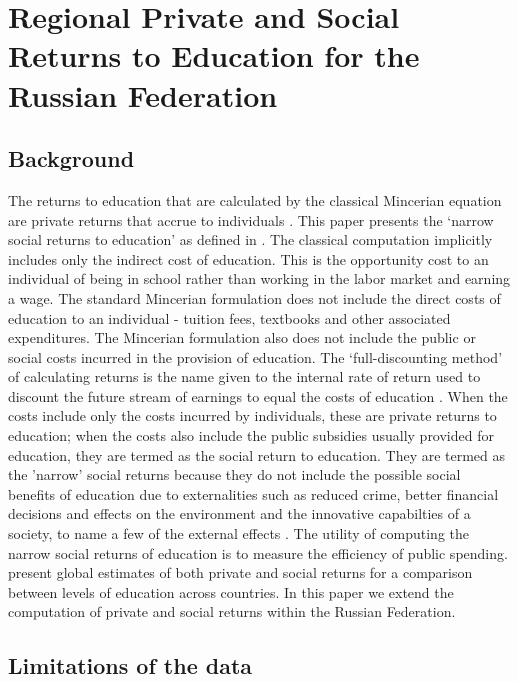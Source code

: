 \documentclass[alpha-refs]{wiley-article-05g}
\begin{document}
\vspace{-0.2in}

\section{Regional Private and Social Returns to Education for the Russian Federation}

\subsection{Background}

The returns to education that are calculated by the classical Mincerian equation are private returns that accrue to individuals \parencite{mincer1974}. This paper presents the `narrow social returns to education' as defined in \cite{psacharopoulos2019}. The classical computation implicitly includes only the indirect cost of education. This is the opportunity cost to an individual of being in school rather than working in the labor market and earning a wage. The standard Mincerian formulation does not include the direct costs of education to an individual - tuition fees, textbooks and other associated expenditures. The Mincerian formulation also does not include the public or social costs incurred in the provision of education. The `full-discounting method' of calculating returns is the name given to the internal rate of return used to discount the future stream of earnings to equal the costs of education \parencite{psacharopoulos1995}. When the costs include only the costs incurred by individuals, these are private returns to education; when the costs also include the public subsidies usually provided for education, they are termed as the social return to education. They are termed as the 'narrow' social returns because they do not include the possible social benefits of education due to externalities such as reduced crime, better financial decisions and effects on the environment and the innovative capabilties of a society, to name a few of the external effects \parencite{wolfe2002,mcmahon2004,owens2004}.  The utility of computing the narrow social returns of education is to measure the efficiency of public spending. \cite{Psacharopoulos_Patrinos2018} present global estimates of both private and social returns for a comparison between levels of education across countries. In this paper we extend the computation of private and social returns within the Russian Federation. 

\subsection{Limitations of the data} 
\end{document}

